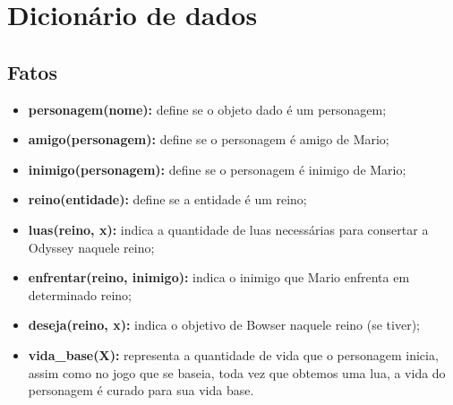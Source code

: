 \chapter{Dicionário de dados}
\label{sec-dicionario}

\section{Fatos}
	\begin{itemize}
		\item \textbf{personagem(nome):} define se o objeto dado é um personagem;
		\item \textbf{amigo(personagem):} define se o personagem é amigo de Mario;
		\item \textbf{inimigo(personagem):} define se o personagem é inimigo de Mario;
		\item \textbf{reino(entidade):} define se a entidade é um reino;
		\item \textbf{luas(reino, x):} indica a quantidade de luas necessárias para consertar a Odyssey naquele reino;
		\item \textbf{enfrentar(reino, inimigo):} indica o inimigo que Mario enfrenta em determinado reino;
		\item \textbf{deseja(reino, x):} indica o objetivo de Bowser naquele reino (se tiver);
		\item \textbf{vida\_base(X):} representa a quantidade de vida que o personagem inicia, assim como no jogo que se baseia, toda vez que obtemos uma lua, a vida do personagem é curado para sua vida base.		
	\end{itemize}

